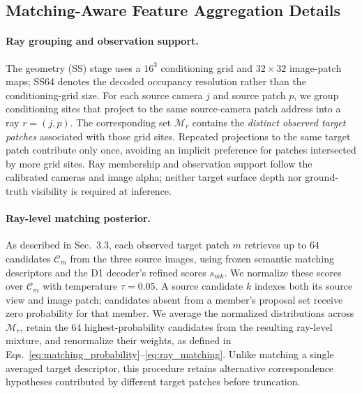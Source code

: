 \begin{appendix}
\section{Matching-Aware Feature Aggregation Details}
\label{sec:supp_matching_aggregation}

\paragraph{Ray grouping and observation support.}
The geometry (SS) stage uses a $16^3$ conditioning grid and $32\times32$ image-patch maps; SS64 denotes the decoded occupancy resolution rather than the conditioning-grid size.
For each source camera $j$ and source patch $p$, we group conditioning sites that project to the same source-camera patch address into a ray $r=(j,p)$.
The corresponding set $\mathcal{M}_r$ contains the \emph{distinct observed target patches} associated with those grid sites.
Repeated projections to the same target patch contribute only once, avoiding an implicit preference for patches intersected by more grid sites.
Ray membership and observation support follow the calibrated cameras and image alpha; neither target surface depth nor ground-truth visibility is required at inference.

\paragraph{Ray-level matching posterior.}
As described in Sec.~3.3, each observed target patch $m$ retrieves up to $64$ candidates $\mathcal{C}_m$ from the three source images, using frozen semantic matching descriptors and the D1 decoder's refined scores $s_{mk}$.
We normalize these scores over $\mathcal{C}_m$ with temperature $\tau=0.05$.
A source candidate $k$ indexes both its source view and image patch; candidates absent from a member's proposal set receive zero probability for that member.
We average the normalized distributions across $\mathcal{M}_r$, retain the $64$ highest-probability candidates from the resulting ray-level mixture, and renormalize their weights, as defined in Eqs.~\eqref{eq:matching_probability}--\eqref{eq:ray_matching}.
Unlike matching a single averaged target descriptor, this procedure retains alternative correspondence hypotheses contributed by different target patches before truncation.


\end{appendix}
